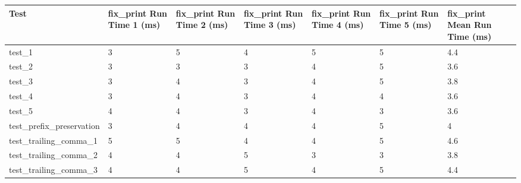 \begin{table}[h!]
    \centering
    \begin{tabular}{@{}l|p{5em}p{5em}p{5em}p{5em}p{5em}p{5em}@{}}
    \toprule
    Test                                  & fix\_print Run Time 1 (ms) & fix\_print Run Time 2 (ms) & fix\_print Run Time 3 (ms) & fix\_print Run Time 4 (ms) & fix\_print Run Time 5 (ms) & fix\_print Mean Run Time (ms) \\ \midrule
    test\_1                               & 3                          & 5                          & 4                          & 5                          & 5                          & 4.4                              \\
    test\_2                               & 3                          & 3                          & 3                          & 4                          & 5                          & 3.6                              \\
    test\_3                               & 3                          & 4                          & 3                          & 4                          & 5                          & 3.8                              \\
    test\_4                               & 3                          & 4                          & 3                          & 4                          & 4                          & 3.6                              \\
    test\_5                               & 4                          & 4                          & 3                          & 4                          & 3                          & 3.6                              \\
    test\_prefix\_preservation            & 3                          & 4                          & 4                          & 4                          & 5                          & 4                                \\
    test\_trailing\_comma\_1              & 5                          & 5                          & 4                          & 4                          & 5                          & 4.6                              \\
    test\_trailing\_comma\_2              & 4                          & 4                          & 5                          & 3                          & 3                          & 3.8                              \\
    test\_trailing\_comma\_3              & 4                          & 4                          & 5                          & 4                          & 5                          & 4.4                              \\

\end{tabular}
\end{table}
